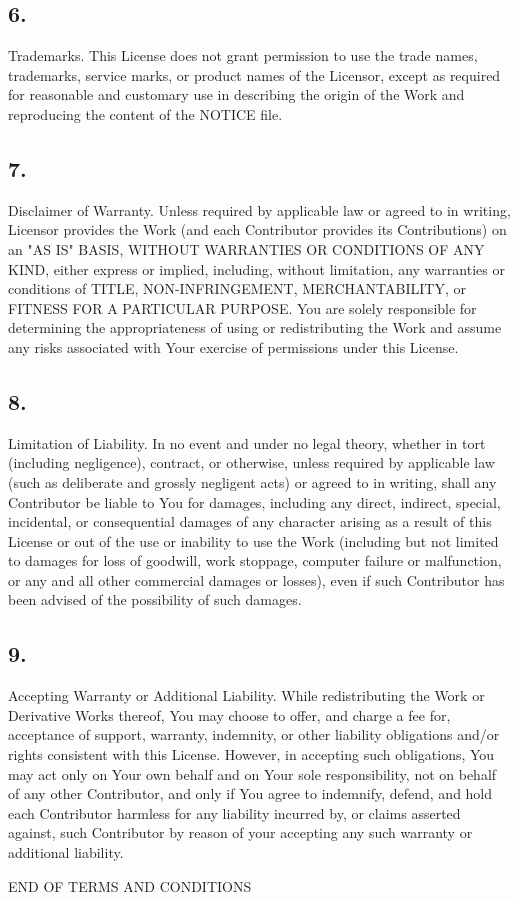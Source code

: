 \subsection{6.} Trademarks. This License does not grant permission to use the trade names, trademarks, service marks, or product names of the Licensor, except as required for reasonable and customary use in describing the origin of the Work and reproducing the content of the NOTICE file.

\subsection{7.} Disclaimer of Warranty. Unless required by applicable law or agreed to in writing, Licensor provides the Work (and each Contributor provides its Contributions) on an "AS IS" BASIS, WITHOUT WARRANTIES OR CONDITIONS OF ANY KIND, either express or implied, including, without limitation, any warranties or conditions of TITLE, NON-INFRINGEMENT, MERCHANTABILITY, or FITNESS FOR A PARTICULAR PURPOSE. You are solely responsible for determining the appropriateness of using or redistributing the Work and assume any risks associated with Your exercise of permissions under this License.

\subsection{8.} Limitation of Liability. In no event and under no legal theory, whether in tort (including negligence), contract, or otherwise, unless required by applicable law (such as deliberate and grossly negligent acts) or agreed to in writing, shall any Contributor be liable to You for damages, including any direct, indirect, special, incidental, or consequential damages of any character arising as a result of this License or out of the use or inability to use the Work (including but not limited to damages for loss of goodwill, work stoppage, computer failure or malfunction, or any and all other commercial damages or losses), even if such Contributor has been advised of the possibility of such damages.

\subsection{9.} Accepting Warranty or Additional Liability. While redistributing the Work or Derivative Works thereof, You may choose to offer, and charge a fee for, acceptance of support, warranty, indemnity, or other liability obligations and/or rights consistent with this License. However, in accepting such obligations, You may act only on Your own behalf and on Your sole responsibility, not on behalf of any other Contributor, and only if You agree to indemnify, defend, and hold each Contributor harmless for any liability incurred by, or claims asserted against, such Contributor by reason of your accepting any such warranty or additional liability.

END OF TERMS AND CONDITIONS
